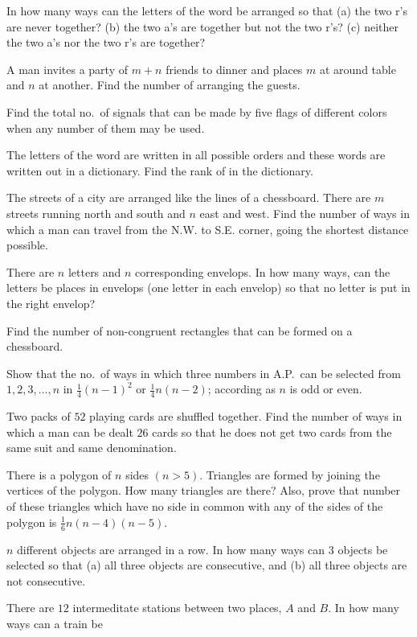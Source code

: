 \item In how many ways can the letters of the word  be arranged so that (a) the two r's are never together? (b) the two
  a's are together but not the two r's? (c) neither the two a's nor the two r's are together?
\item A man invites a party of $m + n$ friends to dinner and places $m$ at around table and $n$ at another. Find the number of
  arranging the guests.
\item Find the total no.\ of signals that can be made by five flags of different colors when any number of them may be used.
\item The letters of the word  are written in all possible orders and these words are written out in a dictionary. Find
  the rank of  in the dictionary.
\item The streets of a city are arranged like the lines of a chessboard. There are $m$ streets running north and south and $n$ east
  and west. Find the number of ways in which a man can travel from the N.W. to S.E. corner, going the shortest distance possible.
\item There are $n$ letters and $n$ corresponding envelops. In how many ways, can the letters be places in envelops (one letter in
  each envelop) so that no letter is put in the right envelop?
\item Find the number of non-congruent rectangles that can be formed on a chessboard.
\item Show that the no.\ of ways in which three numbers in A.P.\ can be selected from $1, 2, 3, \ldots, n$ in $\frac{1}{4}{(n -
  1)}^2$ or $\frac{1}{4}n(n - 2)$; according as $n$ is odd or even.
\item Two packs of $52$ playing cards are shuffled together. Find the number of ways in which a man can be dealt $26$ cards so that
  he does not get two cards from the same suit and same denomination.
\item There is a polygon of $n$ sides $(n > 5)$. Triangles are formed by joining the vertices of the polygon. How many triangles
  are there? Also, prove that number of these triangles which have no side in common with any of the sides of the polygon is
  $\frac{1}{6}n(n - 4)(n - 5)$.
\item $n$ different objects are arranged in a row. In how many ways can $3$ objects be selected so that (a) all three objects are
  consecutive, and (b) all  three objects are not consecutive.
\item There are $12$ intermeditate stations between two places, $A$ and $B$. In how many ways can a train be
